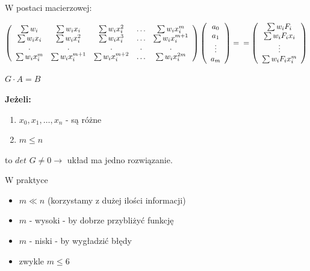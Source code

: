 \begin{frame}
	W postaci macierzowej:
    \begin{center}
    	 $\left(\begin{array}{ccccc}
    \sum w_i & \sum w_ix_i & \sum w_ix_i^2 & \ldots & \sum w_i x_i^m \\
    \sum w_ix_i & \sum w_ix_i^2 & \sum w_ix_i^3 & \ldots & \sum w_i x_i^{m+1} \\
    . & . & . & . & . \\
    \sum w_ix_i^m & \sum w_ix_i^{m+1} & \sum w_ix_i^{m+2} & \ldots & \sum w_i x_i^{2m}
    \end{array}\right)
    \left(\begin{array}{c}
    	a_0 \\ a_1 \\ \vdots \\ a_m
    \end{array}\right) =\newline=
    \left(\begin{array}{c}
    	\sum w_iF_i\\
        \sum w_i F_i x_i \\
        \vdots \\
        \sum w_i F_i x_i^m
    \end{array}\right)$
    \end{center}
    \begin{center}
    	\underline{$G \cdot A = B$}
    \end{center}
   	
\end{frame}
\begin{frame}
	\textbf{Jeżeli:}
    \begin{enumerate}
    \item $x_0,x_1,\ldots,x_n$ - są różne
    \item $m \leqslant n$
    \end{enumerate}
    to $det$ $G \not= 0 \rightarrow$ układ ma jedno rozwiązanie. 
\end{frame}
\begin{frame}{W praktyce}
	\begin{itemize}
	\item $m \ll n$ (korzystamy z dużej ilości informacji)
    \item $m$ - wysoki - by dobrze przybliżyć funkcję
    \item $m$ - niski - by wygładzić błędy
    \item zwykle $m \leqslant 6$
	\end{itemize}
\end{frame}
